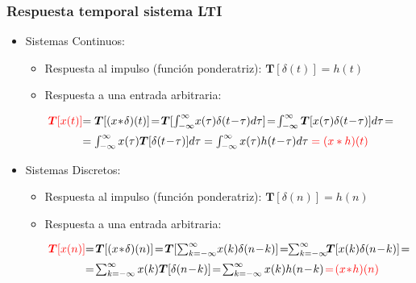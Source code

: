 

\begin{frame}
\frametitle{Respuesta temporal sistema LTI}

\vspace{-0,3cm}


\begin{itemize}
\item <1-> \alert{Sistemas Continuos}:

\begin{itemize}
\item Respuesta al impulso (función ponderatriz):   $\bm{T}[\delta(t)]=h(t)$
	
	\vspace{0,1cm}
	
\item Respuesta a una entrada arbitraria:

\vspace{0,2cm}

\footnotesize $\begin{array}{ll}\color{red}\!\!\bm{T}[x(t)]\color{black}\!\!\!\!\!\!&=\bm{T}[(x\!*\!\delta)(t)]\!=\!\bm{T}[\int_{-\infty}^{\infty} \! x(\tau)\delta({t\!-\!\tau})d\tau] \!=\!\int_{-\infty}^{\infty}\bm{T}[x(\tau)\delta({t\!-\!\tau})]d\tau \!=\\ [0.2cm]  & =\int_{-\infty}^{\infty} x(\tau) \bm{T}[\delta({t\!-\!\tau})]d\tau  =\int_{-\infty}^{\infty} x(\tau)  h(t\!-\!\tau) d\tau \color{red}= (x*h)(t)\color{black} \end{array}$


\end{itemize}


\item <2-> \alert{Sistemas Discretos}:

\begin{itemize}
\item Respuesta al impulso (función ponderatriz):   $\bm{T}[\delta(n)]=h(n)$
	
	\vspace{0,1cm}
	
\item  Respuesta a una entrada arbitraria:

\vspace{0,1cm}

\footnotesize $\begin{array}{ll}\color{red}\!\!\bm{T}[x(n)]\color{black}\!\!\!\!\!\!&=\!\bm{T}[(x\!*\!\delta)(n)]\!=\!\bm{T}[\sum_{k=-\infty}^{\infty} \! x(k)\delta({n\!-\!k})] \!=\!\!\sum_{k=-\infty}^{\infty}\! \!\bm{T}[x(k)\delta({n\!-\!k})]\!=\\ [0.2cm]  & =\!\sum_{k=-\infty}^{\infty} x(k) \bm{T}[\delta({n\!-\!k})]  \!=\!\sum_{k=-\infty}^{\infty} x(k)  h(n\!-\!k) \color{red} \!=\! (x\!*\!h)(n)\color{black} \end{array}$


\end{itemize}
\end{itemize}
\end{frame}
